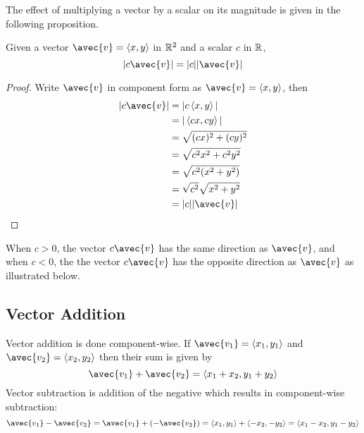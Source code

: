 \documentclass[handout]{ximera}
\begin{document}
The effect of multiplying a vector by a scalar on its magnitude is given in the following proposition.
\begin{proposition}
Given a vector $\avec{v} = \vector{x,y}$ in $\mathbb R^2$ and a scalar $c$ in $\mathbb R$,
\[
|c\avec{v}| = |c| |\avec{v}|
\]
\begin{proof}
Write $\avec{v}$ in component form as $\avec{v} = \vector{x,y}$, then
\begin{align*}
|c\avec{v}| &= |c\vector{x,y}|\\
            &= |\vector{cx,cy}|\\
            &= \sqrt{(cx)^2 + (cy)^2}\\
            &= \sqrt{c^2x^2 + c^2y^2}\\
            &= \sqrt{c^2(x^2 + y^2)}\\
            &= \sqrt{c^2} \sqrt{x^2 + y^2}\\
            &= |c| |\avec{v}|
\end{align*}
\end{proof}
\end{proposition}

When $c>0$, the vector $c\avec{v}$ has the same direction as $\avec{v}$, and when $c<0$, the
the vector $c\avec{v}$ has the opposite direction as $\avec{v}$ as illustrated below.



\begin{image}
\end{image}


\subsection{Vector Addition}
Vector addition is done component-wise.  If $\avec{v_1} = \vector{x_1, y_1}$ and $\avec{v_2} = \vector{x_2, y_2}$
then their sum is given by
\[
\avec{v_1 }+ \avec{ v_2}= \vector{x_1+x_2,  y_1+y_2}
\]
Vector subtraction is addition of the negative which results in component-wise subtraction:
\[
\avec{v_1 }- \avec{ v_2}= \avec{v_1 }+ \left(- \avec{ v_2}\right)  = \vector{x_1,y_1} + \vector{-x_2, -y_2} = \vector{x_1-x_2,  y_1-y_2}
\]
\end{document}
